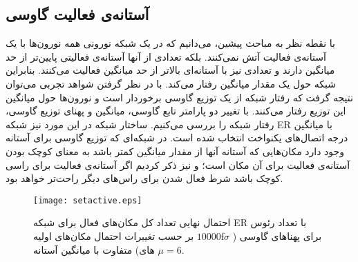 \subsection{آستانه‌ی فعالیت گاوسی}
با نقطه نظر به مباحث پیشین، می‌دانیم که در یک شبکه نورونی ‌‌همه نورون‌ها با یک آستانه‌ی فعالیت آتش نمی‌کنند. بلکه تعدادی از آنها آستانه‌ی فعالیتی پایین‌تر از حد میانگین دارند  و تعدادی نیز با آستانه‌ای بالاتر از حد میانگین فعالیت می‌کنند. بنابراین شبکه حول یک مقدار میانگین رفتار می‌کند. با در نظر گرفتن شواهد تجربی می‌توان نتیجه گرفت که رفتار شبکه از یک توزیع گاوسی برخوردار است و نورون‌ها حول میانگین این توزیع رفتار می‌کنند. با تغییر دو پارامتر تابع گاوسی، میانگین و پهنای توزیع گاوسی، رفتار شبکه را بررسی می‌کنیم. ساختار شبکه در این مورد نیز شبکه ER با میانگین درجه اتصال‌های یکنواخت انتخاب شده است. 
در شبکه‌ای که توزیع گاوسی برای آستانه وجود دارد مکان‌هایی که آستانه آنها از مقدار میانگین کمتر باشد به معنای کوچک بودن آستانه‌ی فعالیت برای آن مکان است؛ و نیز ذکر کردیم اگر آستانه‌ی فعالیت برای راسی کوچک باشد شرط فعال شدن برای راس‌های دیگر راحت‌تر خواهد بود.

 
\begin{figure}[htbp]
\hspace*{0cm}
\centering
\texttt{[image: setactive.eps]}\centering
\caption [منحنی مربوط‌ به احتمال  نهایی تعداد کل مکان‌های فعال  برای شبکه ER با آستانه گاوسی]{\footnotesize 
احتمال  نهایی تعداد کل مکان‌های فعال برای شبکه ER با تعداد رئوس  $10000$ بر حسب  تغییرات احتمال مکان‌های اولیهfبرای  پهناهای گاوسی  ( $\sigma$های) متفاوت با میانگین آستانه $\mu = 6$.}
\label{fig:ER}
\end{figure}


